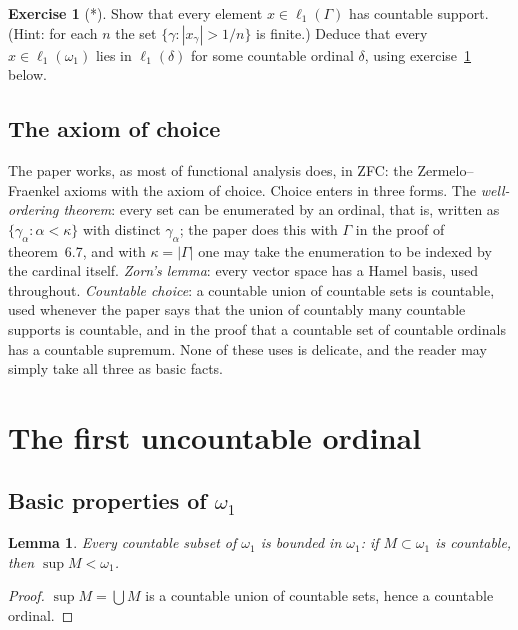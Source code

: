 \documentclass[12pt]{article}
\newtheorem{lemma}[theorem]{Lemma}
\theoremstyle{definition}
\newtheorem{exercise}[theorem]{Exercise}
\theoremstyle{remark}
\newcommand{\ellone}[1]{\ell_1(#1)}
\begin{document}
\begin{exercise}[*] Show that every element $x\in\ellone{\Gamma}$ has countable
    support. (Hint: for each $n$ the set $\{\gamma:|x_\gamma|>1/n\}$ is
    finite.) Deduce that every $x\in\ellone{\omega_1}$ lies in $\ellone{\delta}$
    for some countable ordinal $\delta$, using exercise~\ref{BoundedSubsets}
    below.
\end{exercise}

\subsection{The axiom of choice}\label{SecChoice}

The paper works, as most of functional analysis does, in ZFC: the
Zermelo--Fraenkel axioms with the axiom of choice. Choice enters in three
forms. The \emph{well-ordering theorem}: every set can be enumerated by an
ordinal, that is, written as $\{\gamma_\alpha:\alpha<\kappa\}$ with distinct
$\gamma_\alpha$; the paper does this with $\Gamma$ in the proof of
theorem~6.7, and with $\kappa=|\Gamma|$ one may take the enumeration to be
indexed by the cardinal itself. \emph{Zorn's lemma}: every vector space has a
Hamel basis, used throughout. \emph{Countable choice}: a countable union of
countable sets is countable, used whenever the paper says that the union of
countably many countable supports is countable, and in the proof that a
countable set of countable ordinals has a countable supremum. None of these
uses is delicate, and the reader may simply take all three as basic facts.

\section{The first uncountable ordinal}\label{SecOmegaOne}

\subsection{Basic properties of $\omega_1$}

\begin{lemma}\label{BoundedSubsets} Every countable subset of $\omega_1$ is
    bounded in $\omega_1$: if $M\subset\omega_1$ is countable, then
    $\sup M<\omega_1$.
\end{lemma}
\begin{proof} $\sup M=\bigcup M$ is a countable union of countable sets, hence
    a countable ordinal.
\end{proof}
\end{document}
